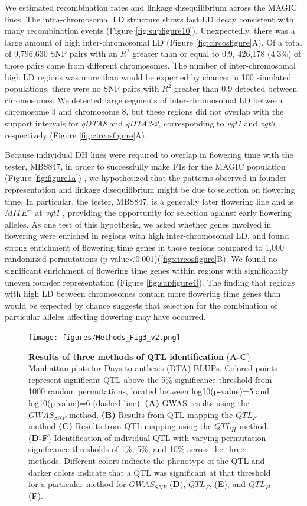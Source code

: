 \documentclass[9pt,twocolumn,twoside]{gsag3jnl}
\begin{document}
We estimated recombination rates and linkage disequilibrium across the MAGIC lines.
The intra-chromosomal LD structure shows fast LD decay consistent with many recombination events (Figure \ref{fig:supfigure10}).
Unexpectedly, there was a large amount of high inter-chromosomal LD (Figure \ref{fig:circosfigure}A).
Of a total of 9,796,630 SNP pairs with an $R^2$ greater than or equal to 0.9, 426,178 (4.3\%) of those pairs came from different chromosomes.
The number of inter-chromosomal high LD regions was more than would be expected by chance:
in 100 simulated populations, there were no SNP pairs with $R^2$ greater than 0.9 detected between chromosomes.
We detected large segments of inter-chromosomal LD between chromosome 3 and chromosome 8, but these regions did not overlap with the support intervals for \emph{qDTA8} and \emph{qDTA3-2}, corresponding to \emph{vgt1} and \emph{vgt3}, respectively (Figure \ref{fig:circosfigure}A).

Because individual DH lines were required to overlap in flowering time with the tester, MBS847, in order to successfully make F1s for the MAGIC population (Figure \ref{fig:figure1a}) , we hypothesized that the patterns observed in founder representation and linkage disequilibrium might be due to selection on flowering time.
In particular, the tester, MBS847, is a generally later flowering line and is $MITE^-$ at \emph{vgt1} \citep{Chardon}, providing the opportunity for selection against early flowering alleles.
As one test of this hypothesis, we asked whether genes involved in flowering were enriched in regions with high inter-chromosomal LD, and found strong enrichment of flowering time genes  in those regions compared to 1,000 randomized permutations (p-value<0.001)(\ref{fig:circosfigure}B).
We found no significant enrichment of flowering time genes within regions with significantly uneven founder representation (Figure \ref{fig:supfigure4}).
The finding that regions with high LD between chromosomes contain more flowering time genes than would be expected by chance suggests that selection for the combination of particular alleles affecting flowering may have occurred.

\begin{figure}[h!p]
\centering
\texttt{[image: figures/Methods\_Fig3\_v2.png]}
\caption{\textbf{Results of three methods of QTL identification} (\textbf{A-C}) Manhattan plots for Days to anthesis (DTA) BLUPs. Colored points represent significant QTL above the 5\% significance threshold from 1000 random permutations, located between log10(p-value)=5 and log10(p-value)=6 (dashed line). \textbf{(A)} GWAS results using the $GWAS_{SNP}$ method. \textbf{(B)} Results from QTL mapping the $QTL_F$ method \textbf{(C)} Results from QTL mapping using the $QTL_H$ method. (\textbf{D-F}) Identification of individual QTL with varying permutation significance thresholds of 1\%, 5\%, and 10\% across the three methods. Different colors indicate the phenotype of the QTL and darker colors indicate that a QTL was significant at that threshold for a particular method for $GWAS_{SNP}$ (\textbf{D}), $QTL_F$, (\textbf{E}), and $QTL_H$ (\textbf{F}).}
\label{fig:figure3}
\end{figure}
\end{document}
